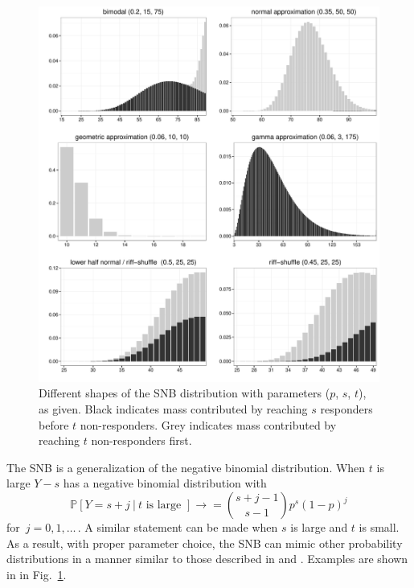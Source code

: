 \documentclass[review]{elsarticle}
\begin{document}
\begin{figure}[p!]
\begin{center}
\includegraphics[width=\textwidth]{shapes.pdf}
\end{center}
\caption{Different shapes of the SNB distribution with parameters 
($p$, $s$, $t$), as given. Black indicates mass contributed by reaching
$s$ responders before $t$ non-responders. Grey indicates
mass contributed by reaching $t$ non-responders first. \label{shapes.fig}}
\end{figure}

The SNB is a generalization of the negative 
binomial distribution. When $t$ is large $Y-s$ has a 
negative binomial distribution with
\begin{equation*}                                    %
\mathbb{P}[Y=s+j\ |\ t \text{ is large\ }]        \label{nb1.eq}          
  \rightarrow = {{s+j-1}\choose{s-1}} p^s (1-p)^j
\end{equation*}
for $\,j=0, 1,\ldots\,$. A similar statement can be made when $s$ is large
and $t$ is small. As a result, with proper parameter choice, the SNB
can mimic other probability distributions in a manner similar to 
those described in \cite{Peizer1968} and \cite{Best1974}. Examples are
shown in in Fig.~\ref{shapes.fig}. 
\end{document}
